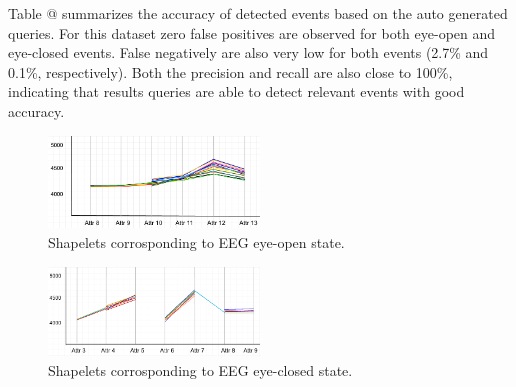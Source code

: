 \documentclass[conference]{IEEEtran}  %
\makeatletter
\newcommand*{\rom}[1]{\expandafter\@slowromancap\romannumeral #1@}
\makeatother
\begin{document}
Table \rom{2} summarizes the accuracy of detected events based on the auto generated queries. For this dataset zero false positives are observed for both eye-open and eye-closed events. False negatively are also very low for both events (2.7\% and 0.1\%, respectively). Both the precision and recall are also close to 100\%, indicating that results queries are able to detect relevant events with good accuracy.

\begin{figure}[h!]
\includegraphics[width=0.5\textwidth]{EEG_event1.png}
\caption{Shapelets corrosponding to EEG eye-open state.}
\label{fig:EEGEvent1}
\end{figure}

\begin{figure}[h!]
\includegraphics[width=0.5\textwidth]{EEG_event2.png}
\caption{Shapelets corrosponding to EEG eye-closed state.}
\label{fig:EEGevent2}
\end{figure}

\end{document}
